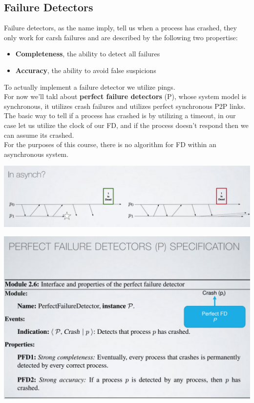 \documentclass[11pt, a4paper]{article}
\begin{document}
\subsection{Failure Detectors}
Failure detectors, as the name imply, tell us when a process has crashed, they only work for carsh failures and are described by the following two propertise:
\begin{itemize}
    \item \textbf{Completeness}, the ability to detect all failures
    \item \textbf{Accuracy}, the ability to avoid false suspicions
\end{itemize}
To actually implement a failure detector we utilize pings.\\
For now we'll takl about \textbf{perfect failure detectors} (P), whose system model is synchronous, it utilizes crash failures and utilizes perfect synchronous P2P links. The basic way to tell if a process has crashed is by utilizing a timeout, in our case let us utilize the clock of our FD, and if the process doesn't respond then we can assume its crashed.\\
For the purposes of this course, there is no algorithm for FD within an asynchronous system.
\begin{center}
    \includegraphics[scale=0.5]{img/FD/async.png}
\end{center}
\begin{center}
    \includegraphics[scale=0.5]{img/FD/specs.png}
\end{center}
\end{document}
